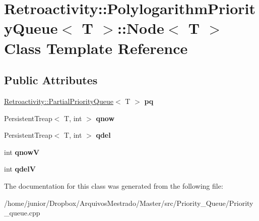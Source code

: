 \hypertarget{classRetroactivity_1_1PolylogarithmPriorityQueue_1_1Node}{}\section{Retroactivity\+:\+:Polylogarithm\+Priority\+Queue$<$ T $>$\+:\+:Node$<$ T $>$ Class Template Reference}
\label{classRetroactivity_1_1PolylogarithmPriorityQueue_1_1Node}
\subsection*{Public Attributes}
\begin{DoxyCompactItemize}
\item 
\mbox{\label{classRetroactivity_1_1PolylogarithmPriorityQueue_1_1Node_a26daf36516b62ada967b6d4e26c09e95}} 
\hyperlink{classRetroactivity_1_1PartialPriorityQueue}{Retroactivity\+::\+Partial\+Priority\+Queue}$<$ T $>$ {\bfseries pq}
\item 
\mbox{\label{classRetroactivity_1_1PolylogarithmPriorityQueue_1_1Node_a8024a7ac76ec45132d1e4ac19bff6e9d}} 
Persistent\+Treap$<$ T, int $>$ {\bfseries qnow}
\item 
\mbox{\label{classRetroactivity_1_1PolylogarithmPriorityQueue_1_1Node_a00caf8eda06c403ecfefd2f777f3a2e2}} 
Persistent\+Treap$<$ T, int $>$ {\bfseries qdel}
\item 
\mbox{\label{classRetroactivity_1_1PolylogarithmPriorityQueue_1_1Node_a5f1d5cc87386229607d5be55049b2a09}} 
int {\bfseries qnowV}
\item 
\mbox{\label{classRetroactivity_1_1PolylogarithmPriorityQueue_1_1Node_a0df9950a79169ae35b125e6c1b65b918}} 
int {\bfseries qdelV}
\end{DoxyCompactItemize}


The documentation for this class was generated from the following file\+:\begin{DoxyCompactItemize}
\item 
/home/junior/\+Dropbox/\+Arquivos\+Mestrado/\+Master/src/\+Priority\+\_\+\+Queue/Priority\+\_\+queue.\+cpp\end{DoxyCompactItemize}
